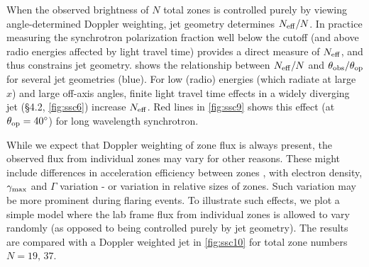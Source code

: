 When the observed brightness of $N$ total zones is controlled purely by viewing angle-determined Doppler weighting, jet geometry determines $N_{\rm eff}/N$. In practice measuring the synchrotron polarization fraction well below the cutoff (and above radio energies affected by light travel time) provides a direct measure of $N_{\rm eff}$, and thus constrains jet geometry.  shows the relationship between $N_{\rm eff}/N$ and $\theta_{\rm obs}/\theta_{\rm op}$ for several jet geometries (blue). For low (radio) energies (which radiate at large $x$) and large off-axis angles, finite light travel time effects in a widely diverging jet (\S4.2, \cref{fig:ssc6}) increase $N_{\rm eff}$. Red lines in \cref{fig:ssc9} shows this effect (at $\theta_{\rm op} = 40^{\circ}$) for long wavelength synchrotron. %

While we expect that Doppler weighting of zone flux is always present, the observed flux from individual zones may vary for other reasons. These might include differences in acceleration efficiency between zones \citep{marscher_turbulent_2014}, with electron density, $\gamma_{\rm max}$ and $\Gamma$ variation - or variation in relative sizes of zones. Such variation may be more prominent during flaring events.
To illustrate such effects, we plot a simple model where the lab frame flux from individual zones is allowed to vary randomly (as opposed to being controlled purely by jet geometry). The results are compared with a Doppler weighted jet in \cref{fig:ssc10} for total zone numbers $N = 19,\, 37.$

